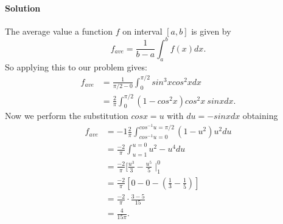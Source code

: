 \documentclass[letterpaper,12pt,oneside,onecolumn]{article}
\begin{document}
\paragraph{Solution}
The average value a function $f$ on interval $[a,b]$ is given by $$f_{ave} = \frac{1}{b-a} \int_a^b f(x) dx.$$
So applying this to our problem gives:
\begin{align*}
f_{ave} &= \frac{1}{\pi/2 - 0}\int_{0}^{\pi/2} sin^3xcos^2x dx \\
&= \frac{2}{\pi} \int_{0}^{\pi/2} (1-cos^2x)cos^2x\ sinx dx.
\end{align*}
Now we perform the substitution $cosx = u$ with $du = -sinxdx$ obtaining
\begin{align*}
f_{ave} &= -1\frac{2}{\pi}\int_{cos^{-1}u = 0}^{cos^{-1}u=\pi/2} (1-u^2)u^2du \\
&=\frac{-2}{\pi}\int_{u=1}^{u=0} u^2 - u^4 du \\
&=\frac{-2}{\pi}[\frac{u^3}{3} -\frac{u^5}{5}\mid^0_1 \\
&= \frac{-2}{\pi}[0 - 0 - (\frac{1}{3} - \frac{1}{5})] \\
&= \frac{-2}{\pi}\cdot\frac{3 - 5}{15} \\
&= \frac{4}{15\pi}. 
\end{align*}
\end{document}

